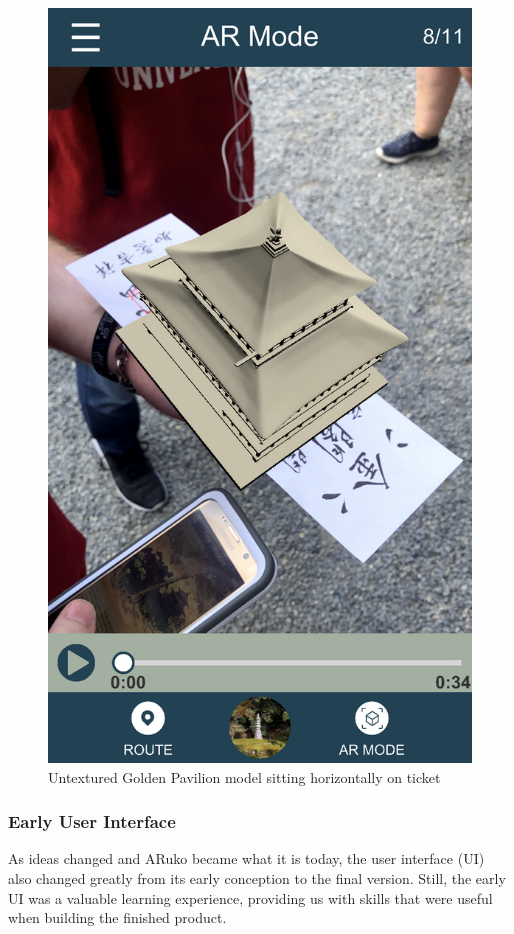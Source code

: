 \documentclass[a4paper, 10pt, american, titlepage]{article}
\begin{document}
\begin{figure}[p]
	\centering
	\includegraphics[width=.8\textwidth]{kinkakuji-horizontal.png}
	\caption{Untextured Golden Pavilion model sitting horizontally on ticket}
	\label{fig:kinkakujiHorizontal}
\end{figure}

\subsubsection{Early User Interface}
\label{sec:earlyUserInterface}

As ideas changed and ARuko became what it is today, the user interface (UI) also
changed greatly from its early conception to the final version. Still, the early
UI was a valuable learning experience, providing us with skills that were useful
when building the finished product.
\end{document}
